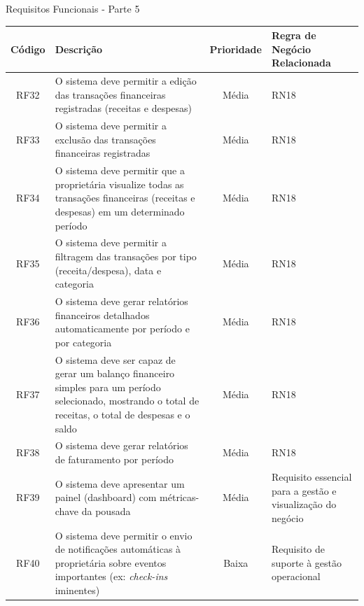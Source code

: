 \documentclass[
	12pt,				%
	openany,			%
	twoside,			%
	a4paper,			%
	english,			%
	french,				%
	spanish,			%
	brazil				%
	]{abntex2}
\begin{document}
\begin{quadro}[H]
	\caption{Requisitos Funcionais - Parte 5}
	\label{quadro_rf5}
	\begin{tabular}{|c|p{5cm}|c|p{4cm}|}
		\hline
		\textbf{Código} & \textbf{Descrição} & \textbf{Prioridade} & \textbf{Regra de Negócio Relacionada} \\ \hline
		RF32 & O sistema deve permitir a edição das transações financeiras registradas (receitas e despesas) & Média & RN18 \\ \hline
		RF33 & O sistema deve permitir a exclusão das transações financeiras registradas & Média & RN18 \\ \hline
		RF34 & O sistema deve permitir que a proprietária visualize todas as transações financeiras (receitas e despesas) em um determinado período & Média & RN18 \\ \hline
		RF35 & O sistema deve permitir a filtragem das transações por tipo (receita/despesa), data e categoria & Média & RN18 \\ \hline
		RF36 & O sistema deve gerar relatórios financeiros detalhados automaticamente por período e por categoria & Média & RN18 \\ \hline
		RF37 & O sistema deve ser capaz de gerar um balanço financeiro simples para um período selecionado, mostrando o total de receitas, o total de despesas e o saldo & Média & RN18 \\ \hline
		RF38 & O sistema deve gerar relatórios de faturamento por período & Média & RN18 \\ \hline
		RF39 & O sistema deve apresentar um painel (dashboard) com métricas-chave da pousada & Média & Requisito essencial para a gestão e visualização do negócio \\ \hline
		RF40 & O sistema deve permitir o envio de notificações automáticas à proprietária sobre eventos importantes (ex: \textit{check-ins} iminentes)
		& Baixa & Requisito de suporte à gestão operacional \\ \hline
	\end{tabular}
\end{quadro}


	
\end{document}
